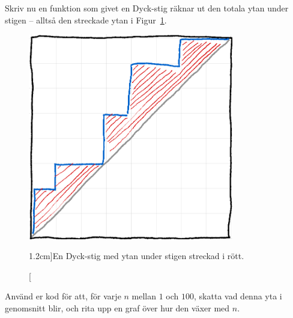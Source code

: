\documentclass[nobib]{tufte-handout}
\begin{document}
\begin{xca}
    Skriv nu en funktion som givet en Dyck-stig räknar ut den totala ytan under stigen -- alltså den streckade ytan i Figur~\ref{fig:area_under_dyck}.

    \begin{figure}
        \centering
        \includegraphics[width=0.8\textwidth]{graphics/area_under_dyck.png}
        \caption[][1.2cm]{En Dyck-stig med ytan under stigen streckad i rött.}
        \label{fig:area_under_dyck}
    \end{figure}

    Använd er kod för att, för varje $n$ mellan $1$ och $100$, skatta vad denna yta i genomsnitt blir, och rita upp en graf över hur den växer med $n$.
\end{xca}

%
%
\end{document}
